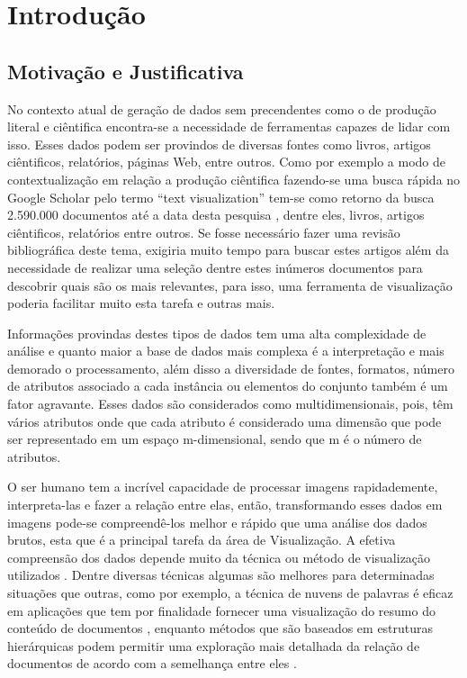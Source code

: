 
\chapter{Introdução}
\label{cap-introducao}

\section{Motivação e Justificativa}

No contexto atual de geração de dados sem precendentes como o de produção literal e ciêntifica encontra-se a necessidade de ferramentas capazes de lidar com isso. Esses dados podem ser provindos de diversas fontes como livros, artigos ciêntificos, relatórios, páginas Web, entre outros. Como por exemplo a modo de contextualização em relação a produção ciêntifica fazendo-se uma busca rápida no Google Scholar pelo termo ``text visualization'' tem-se como retorno da busca 2.590.000 documentos até a data desta pesquisa \cite{IEEEsearch}, dentre eles, livros, artigos ciêntificos, relatórios entre outros. Se fosse necessário fazer uma revisão bibliográfica deste tema, exigiria muito tempo para buscar estes artigos além da necessidade de realizar uma seleção dentre estes inúmeros documentos para descobrir quais são os mais relevantes, para isso, uma ferramenta de visualização poderia facilitar muito esta tarefa e outras mais.

Informações provindas destes tipos de dados tem uma alta complexidade de análise e quanto maior a base de dados mais complexa é a interpretação e mais demorado o processamento, além disso a diversidade de fontes, formatos, número de atributos associado a cada instância ou elementos do conjunto também é um fator agravante. Esses dados são considerados como multidimensionais, pois, têm vários atributos onde que cada atributo é considerado uma dimensão que pode ser representado em um espaço m-dimensional, sendo que m é o número de atributos.

O ser humano tem a incrível capacidade de processar imagens rapidademente, interpreta-las e fazer a relação entre elas, então, transformando esses dados em imagens pode-se compreendê-los melhor e rápido que uma análise dos dados brutos, esta que é a principal tarefa  da área de Visualização. A efetiva compreensão dos dados depende muito da técnica ou método de visualização utilizados \cite{pagliosa2013mist}. Dentre diversas técnicas algumas são melhores para determinadas situações que outras, como por exemplo, a técnica de nuvens de palavras é eficaz em aplicações que tem por finalidade fornecer uma visualização do resumo do conteúdo de documentos \cite{pagliosa2013mist}, enquanto métodos que são baseados em estruturas hierárquicas podem permitir uma exploração mais detalhada da relação de documentos de acordo com a semelhança entre eles \cite{ward2015interactive}.

